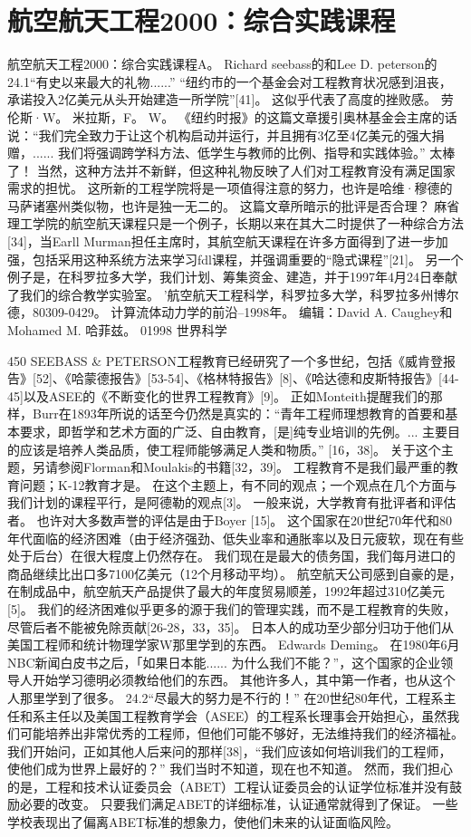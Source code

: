 \documentclass[UTF8,11pt,a4paper,openany,fontset=fandol]{ctexbook}
\begin{document}
\clearpage
\chapter{航空航天工程2000：综合实践课程}
航空航天工程2000：综合实践课程A。 Richard seebass的和Lee D. peterson的24.1“有史以来最大的礼物......” “纽约市的一个基金会对工程教育状况感到沮丧，承诺投入2亿美元从头开始建造一所学院”[41]。 这似乎代表了高度的挫败感。 劳伦斯·W。 米拉斯，F。 W。 《纽约时报》的这篇文章援引奥林基金会主席的话说：“我们完全致力于让这个机构启动并运行，并且拥有3亿至4亿美元的强大捐赠，...... 我们将强调跨学科方法、低学生与教师的比例、指导和实践体验。” 太棒了！ 当然，这种方法并不新鲜，但这种礼物反映了人们对工程教育没有满足国家需求的担忧。 这所新的工程学院将是一项值得注意的努力，也许是哈维·穆德的马萨诸塞州类似物，也许是独一无二的。 这篇文章所暗示的批评是否合理？ 麻省理工学院的航空航天课程只是一个例子，长期以来在其大二时提供了一种综合方法[34]，当Earll Murman担任主席时，其航空航天课程在许多方面得到了进一步加强，包括采用这种系统方法来学习fdl课程，并强调重要的“隐式课程”[21]。 另一个例子是，在科罗拉多大学，我们计划、筹集资金、建造，并于1997年4月24日奉献了我们的综合教学实验室。 '航空航天工程科学，科罗拉多大学，科罗拉多州博尔德，80309-0429。 计算流体动力学的前沿--1998年。 编辑：David A. Caughey和Mohamed M. 哈菲兹。 01998 世界科学

450 SEEBASS \& PETERSON工程教育已经研究了一个多世纪，包括《威肯登报告》[52]、《哈蒙德报告》[53-54]、《格林特报告》[8]、《哈达德和皮斯特报告》[44-45]以及ASEE的《不断变化的世界工程教育》[9]。 正如Monteith提醒我们的那样，Burr在1893年所说的话至今仍然是真实的：“青年工程师理想教育的首要和基本要求，即哲学和艺术方面的广泛、自由教育，[是]纯专业培训的先例。... 主要目的应该是培养人类品质，使工程师能够满足人类和物质。” [16，38]。 关于这个主题，另请参阅Florman和Moulakis的书籍[32，39]。 工程教育不是我们最严重的教育问题；K-12教育才是。 在这个主题上，有不同的观点；一个观点在几个方面与我们计划的课程平行，是阿德勒的观点[3]。 一般来说，大学教育有批评者和评估者。 也许对大多数声誉的评估是由于Boyer [15]。 这个国家在20世纪70年代和80年代面临的经济困难（由于经济强劲、低失业率和通胀率以及日元疲软，现在有些处于后台）在很大程度上仍然存在。 我们现在是最大的债务国，我们每月进口的商品继续比出口多7100亿美元（12个月移动平均）。 航空航天公司感到自豪的是，在制成品中，航空航天产品提供了最大的年度贸易顺差，1992年超过310亿美元[5]。 我们的经济困难似乎更多的源于我们的管理实践，而不是工程教育的失败，尽管后者不能被免除贡献[26-28，33，35]。 日本人的成功至少部分归功于他们从美国工程师和统计物理学家W那里学到的东西。 Edwards Deming。 在1980年6月NBC新闻白皮书之后，「如果日本能...... 为什么我们不能？”，这个国家的企业领导人开始学习德明必须教给他们的东西。 其他许多人，其中第一作者，也从这个人那里学到了很多。 24.2“尽最大的努力是不行的！” 在20世纪80年代，工程系主任和系主任以及美国工程教育学会（ASEE）的工程系长理事会开始担心，虽然我们可能培养出非常优秀的工程师，但他们可能不够好，无法维持我们的经济福祉。 我们开始问，正如其他人后来问的那样[38]，“我们应该如何培训我们的工程师，使他们成为世界上最好的？” 我们当时不知道，现在也不知道。 然而，我们担心的是，工程和技术认证委员会（ABET）工程认证委员会的认证学位标准并没有鼓励必要的改变。 只要我们满足ABET的详细标准，认证通常就得到了保证。 一些学校表现出了偏离ABET标准的想象力，使他们未来的认证面临风险。
\end{document}
